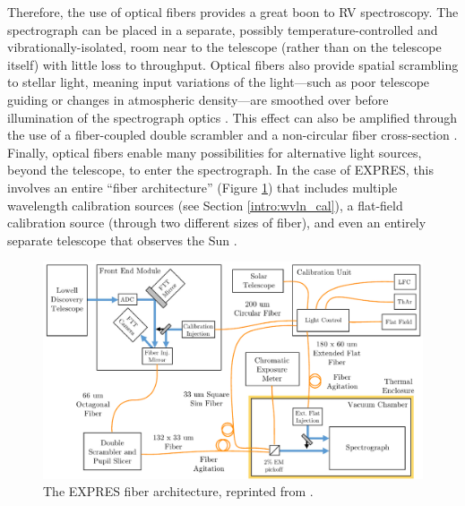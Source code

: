 Therefore, the use of optical fibers provides a great boon to RV spectroscopy. The spectrograph can be placed in a separate, possibly temperature-controlled and vibrationally-isolated, room near to the telescope (rather than on the telescope itself) with little loss to throughput. Optical fibers also provide spatial scrambling to stellar light, meaning input variations of the light---such as poor telescope guiding or changes in atmospheric density---are smoothed over before illumination of the spectrograph optics \citep{hunter_scrambling_1992}. This effect can also be amplified through the use of a fiber-coupled double scrambler \citep{halverson_efficient_2015, spronck_fiber_2015} and a non-circular fiber cross-section \citep{chazelas_new_2010, spronck_use_2012, plavchan_precision_2013}. Finally, optical fibers enable many possibilities for alternative light sources, beyond the telescope, to enter the spectrograph. In the case of EXPRES, this involves an entire ``fiber architecture'' (Figure \ref{fig:expres-fibers}) that includes multiple wavelength calibration sources (see Section \ref{intro:wvln_cal}), a flat-field calibration source (through two different sizes of fiber), and even an entirely separate telescope that observes the Sun \citep{blackman_performance_2020}.

\begin{figure}
    \centering
    \includegraphics[width=\textwidth]{figures-1/expres_schematic_fibersV3.pdf}
    \caption[The EXPRES fiber architecture]{The EXPRES fiber architecture, reprinted from \citet{blackman_performance_2020}.}
    \label{fig:expres-fibers}
\end{figure}

